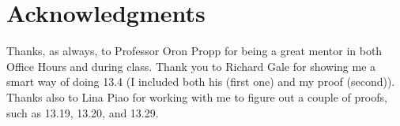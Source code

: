 \documentclass[openany, amssymb, psamsfonts]{amsart}
\theoremstyle{definition}
\numberwithin{equation}{section}
\begin{document}
\section*{Acknowledgments} 
Thanks, as always, to Professor Oron Propp for being a great mentor in both Office Hours and during class. Thank you to Richard Gale for showing me a smart way of doing 13.4 (I included both his (first one) and my proof (second)). Thanks also to Lina Piao for working with me to figure out a couple of proofs, such as 13.19, 13.20, and 13.29.
\begin{thebibliography}{9}




\end{thebibliography}
\end{document}
